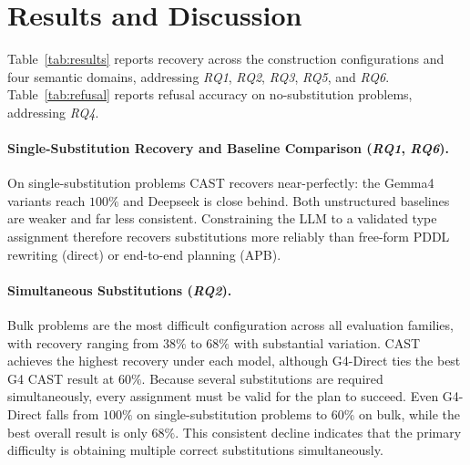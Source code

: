 \section{Results and Discussion}

Table~\ref{tab:results} reports recovery across the construction configurations and four semantic domains, addressing \textit{RQ1}, \textit{RQ2}, \textit{RQ3}, \textit{RQ5}, and \textit{RQ6}. Table~\ref{tab:refusal} reports refusal accuracy on no-substitution problems, addressing \textit{RQ4}.

\paragraph{Single-Substitution Recovery and Baseline Comparison (\textit{RQ1}, \textit{RQ6}).}
 On single-substitution problems CAST recovers near-perfectly: the Gemma4 variants reach $100\%$ and Deepseek is close behind. Both unstructured baselines are weaker and far less consistent. Constraining the LLM to a validated type assignment therefore recovers substitutions more reliably than free-form PDDL rewriting (direct) or end-to-end planning (APB).


\paragraph{Simultaneous Substitutions (\textit{RQ2}).}Bulk problems are the most difficult configuration across all evaluation families, with recovery ranging from $38\%$ to $68\%$ with substantial variation. CAST achieves the highest recovery under each model, although G4-Direct ties the best G4 CAST result at $60\%$. Because several substitutions are required simultaneously, every assignment must be valid for the plan to succeed. Even G4-Direct falls from $100\%$ on single-substitution problems to $60\%$ on bulk, while the best overall result is only $68\%$. This consistent decline indicates that the primary difficulty is obtaining multiple correct substitutions simultaneously.

